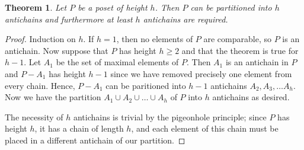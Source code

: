 \documentclass[12pt]{article}
\theoremstyle{plain}
\newtheorem{thm}{Theorem}
\begin{document}
\begin{thm}
Let $P$ be a poset of height $h$. Then $P$ can be partitioned into $h$ antichains and furthermore at least $h$ antichains are required.
\end{thm}

\begin{proof}
Induction on $h$. If $h=1$, then no elements of $P$ are comparable, so $P$ is an antichain. Now suppose that $P$ has height $h\geq 2$ and that the theorem is true for $h-1$. Let $A_1$ be the set of maximal elements of $P$. Then $A_1$ is an antichain in $P$ and $P-A_1$ has height $h-1$ since we have removed precisely one element from every chain. Hence, $P-A_1$ can be paritioned into $h-1$ antichains $A_2,A_3,\dots A_h$. Now we have the partition $A_1\cup A_2\cup\dots\cup A_h$ of $P$ into $h$ antichains as desired.

The necessity of $h$ antichains is trivial by the pigeonhole principle; since $P$ has height $h$, it has a chain of length $h$, and each element of this chain must be placed in a different antichain of our partition.
\end{proof}
\end{document}
